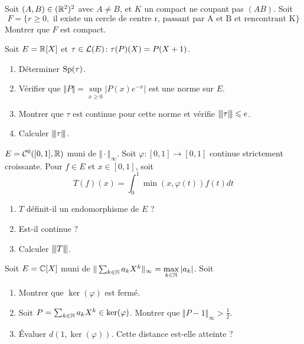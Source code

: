\documentclass[12pt]{article}
\begin{document}
\begin{exercise}
	Soit $(A,B)\in(\mathbb{R}^{2})^{2}$ avec $A\neq B$, et $K$ un compact ne coupant pas $(AB)$. Soit 
	$$F=\{r\geqslant0,\text{ il existe un cercle de centre r, passant par A et B et rencontrant K}\}$$
	Montrer que $F$ est compact.
\end{exercise}

\begin{exercise}
	Soit $E=\mathbb{R}[X]$ et $\tau\in\mathcal{L}(E)\colon\tau(P)(X)=P(X+1)$.
	\begin{enumerate}
		\item Déterminer $\operatorname{Sp}(\tau)$.
		\item Vérifier que $\Vert P\Vert=\sup\limits_{x\geqslant0}\vert P(x)e^{-x}\vert$ est une norme sur $E$.
		\item Montrer que $\tau$ est continue pour cette norme et vérifie ${\left\vert\kern-0.25ex\left\vert\kern-0.25ex\left\vert{}\tau \right\vert\kern-0.25ex\right\vert\kern-0.25ex\right\vert}\leqslant e$.
		\item Calculer ${\left\vert\kern-0.25ex\left\vert\kern-0.25ex\left\vert{}\tau \right\vert\kern-0.25ex\right\vert\kern-0.25ex\right\vert}$.
	\end{enumerate}
\end{exercise}

\begin{exercise}
	$E=\mathcal{C}^{0}([0,1],\mathbb{R})$ muni de $\Vert\cdot\Vert_{\infty}$. Soit $\varphi\colon[0,1]\to[0,1]$ continue strictement croissante. Pour $f\in E$ et $x\in[0,1]$, soit 
	$$T(f)(x)=\int_{0}^{1}\min(x,\varphi(t))f(t)dt$$
	\begin{enumerate}
		\item $T$ définit-il un endomorphisme de $E$ ?
		\item Est-il continue ?
		\item Calculer ${\left\vert\kern-0.25ex\left\vert\kern-0.25ex\left\vert{}T \right\vert\kern-0.25ex\right\vert\kern-0.25ex\right\vert}$.
	\end{enumerate}
\end{exercise}

\begin{exercise}
	Soit $E=\mathbb{C}[X]$ muni de $\Vert\sum_{k\in\mathbb{N}} a_{k}X^{k}\Vert_{\infty}=\max\limits_{k\in\mathbb{N}}\vert a_{k}\vert$. Soit 
	\phantom{}
	\begin{enumerate}
		\item Montrer que $\ker(\varphi)$ est fermé.
		\item Soit $P=\sum_{k\in\mathbb{N}}a_{k}X^{k}\in\ker(\varphi)$. Montrer que $\Vert P-1\Vert_{\infty}>\frac{1}{2}$.
		\item Évaluer $d(1,\ker(\varphi))$. Cette distance est-elle atteinte ?
	\end{enumerate}
\end{exercise}
\end{document}
